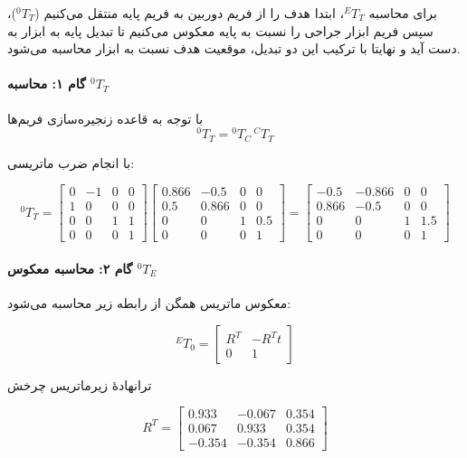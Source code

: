 \documentclass{article}
\begin{document}
برای محاسبه \({}^{E}T_{T}\)، ابتدا هدف را از فریم دوربین به فریم پایه منتقل می‌کنیم (\({}^{0}T_{T}\))، سپس فریم ابزار جراحی را نسبت به پایه معکوس می‌کنیم تا تبدیل پایه به ابزار به ‌دست آید و نهایتا با ترکیب این دو تبدیل، موقعیت هدف نسبت به ابزار محاسبه می‌شود.  

\paragraph{گام ۱: محاسبه \({}^{0}T_{T}\)}
با توجه به قاعده زنجیره‌سازی فریم‌ها
\[
{}^{0}T_{T} = {}^{0}T_{C}\, {}^{C}T_{T}
\]

با انجام ضرب ماتریسی:

\[
{}^{0}T_{T}=
\begin{bmatrix}
	0 & -1 & 0 & 0\\
	1 & 0 & 0 & 0\\
	0 & 0 & 1 & 1\\
	0 & 0 & 0 & 1
\end{bmatrix}
\begin{bmatrix}
	0.866 & -0.5 & 0 & 0\\
	0.5 & 0.866 & 0 & 0\\
	0 & 0 & 1 & 0.5\\
	0 & 0 & 0 & 1
\end{bmatrix}
= \begin{bmatrix}
	-0.5 & -0.866 & 0 & 0\\
	0.866 & -0.5 & 0 & 0\\
	0 & 0 & 1 & 1.5\\
	0 & 0 & 0 & 1
\end{bmatrix}
\]

\paragraph{گام ۲: محاسبه معکوس \({}^{0}T_{E}\)}

معکوس ماتریس همگن از رابطه زیر محاسبه می‌شود:

\[
{}^{E}T_{0}=
\begin{bmatrix}
	R^{T} & -R^{T}t\\
	0 & 1
\end{bmatrix}
\]

ترانهادهٔ زیرماتریس چرخش

\[
R^{T}=
\begin{bmatrix}
	0.933 & -0.067 & 0.354\\
	0.067 & 0.933 & 0.354\\
	-0.354 & -0.354 & 0.866
\end{bmatrix}
\]
\end{document}
